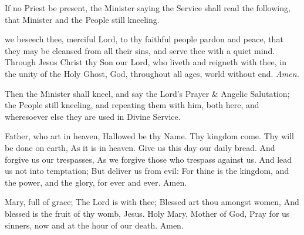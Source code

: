 \begin{rubric}
    If no Priest be present, the Minister saying the Service shall read the following, that Minister and the People still kneeling.
\end{rubric}
 we beseech thee, merciful Lord, to thy faithful people pardon and peace, that they may be cleansed from all their sins, and serve thee with a quiet mind. Through Jesus Christ thy Son our Lord, who liveth and reigneth with thee, in the unity of the Holy Ghost, God, throughout all ages, world without end. \textit{Amen.}

\begin{rubric}
    Then the Minister shall kneel, and say the Lord's Prayer \& Angelic Salutation; the People still kneeling, and repeating them with him, both here, and wheresoever else they are used in Divine Service.
\end{rubric}
 Father, who art in heaven, Hallowed be thy Name. Thy kingdom come. Thy will be done on earth, As it is in heaven. Give us this day our daily bread. And forgive us our trespasses, As we forgive those who trespass against us. And lead us not into temptation; But deliver us from evil: For thine is the kingdom, and the power, and the glory, for ever and ever. Amen.
\par\noindent
{}
 Mary, full of grace; The Lord is with thee; Blessed art thou amongst women, And blessed is the fruit of thy womb, Jesus. Holy Mary, Mother of God, Pray for us sinners, now and at the hour of our death. Amen.
